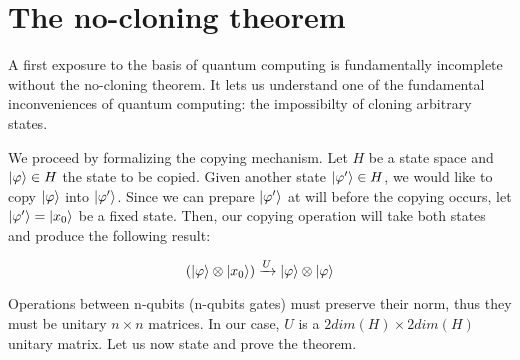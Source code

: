 \section{The no-cloning theorem}


A first exposure to the basis of quantum computing is fundamentally incomplete without the no-cloning theorem. It lets us understand one of the fundamental inconveniences of quantum computing: the impossibilty of cloning arbitrary states.

We proceed by formalizing the copying mechanism. Let $H$ be a state space and $|\varphi\rangle \in H$ the state to be copied. Given another state $|\varphi'\rangle \in H$, we would like to copy $|\varphi\rangle$ into $|\varphi'\rangle$. Since we can prepare $|\varphi'\rangle$ at will before the copying occurs, let  $|\varphi'\rangle = |x_0\rangle$ be a fixed state. Then, our copying operation will take both states and produce the following result:

$$ (|\varphi\rangle \otimes |x_0\rangle) \xrightarrow{U} |\varphi\rangle \otimes |\varphi\rangle $$

Operations between n-qubits (n-qubits gates) must preserve their norm, thus they must be unitary $n \times n$ matrices. In our case, $U$ is a $2 dim(H) \times 2 dim(H)$ unitary matrix. Let us now state and prove the theorem.

